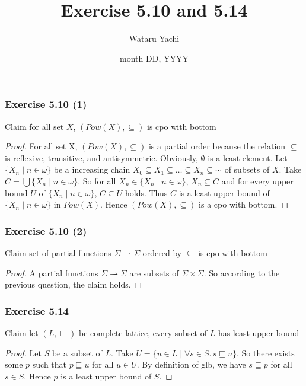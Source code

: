 \documentclass[12pt,aspectratio=169]{beamer}
\title{ Exercise 5.10 and 5.14 }
\author{Wataru Yachi}
\institute{JAIST}
\date{month DD, YYYY}
\begin{document}
\begin{frame}
    \frametitle{Exercise 5.10 (1)}
    \begin{block}{Claim}
        for all set $X$, $(Pow(X), \subseteq)$ is cpo with bottom
    \end{block}
    \pause
    \begin{proof}
        For all set X, $(Pow(X), \subseteq)$ is a partial order because the relation $\subseteq$ is
        reflexive, transitive, and antisymmetric.
        \pause
        Obviously, $\emptyset$ is a least element.
        \pause
        Let $\{X_n \mid n \in \omega \}$ be a increasing chain
        $X_0 \subseteq X_1 \subseteq \dots \subseteq X_n \subseteq \cdots $ of subsets of $X$.
        \pause
        Take $C = \bigcup \{X_n \mid n \in \omega \}$.
        \pause
        So for all $X_n \in \{X_n \mid n \in \omega\}$, $X_n \subseteq C$ and
        for every upper bound $U$ of $\{X_n \mid n \in \omega\}$, $C \subseteq U$ holds.
        \pause
        Thus $C$ is a least upper bound of $\{X_n \mid n \in \omega \}$ in $Pow(X)$.
        \pause
        Hence $(Pow(X), \subseteq)$ is a cpo with bottom.
    \end{proof}
\end{frame}

\begin{frame}
    \frametitle{Exercise 5.10 (2)}
    \begin{block}{Claim}
        set of partial functions $\Sigma \rightharpoonup \Sigma$ ordered by $\subseteq$ is cpo with bottom
    \end{block}
    \pause
    \begin{proof}
        A partial functions $\Sigma \rightharpoonup \Sigma$ are subsets of $\Sigma \times \Sigma$.
        So according to the previous question, the claim holds.
    \end{proof}
\end{frame}

\begin{frame}
    \frametitle{Exercise 5.14}
    \begin{block}{Claim}
        let $(L, \sqsubseteq)$ be complete lattice, every subset of $L$ has least upper bound
    \end{block}
    \pause

    \begin{proof}
        Let $S$ be a subset of $L$. \pause
        Take $U = \{u \in L \mid \forall s \in S . \, s \sqsubseteq u\} $.
        \pause
        So there exists some $p$ such that $p \sqsubseteq u$ for all $u \in U$.
        \pause
        By definition of glb, we have $s \sqsubseteq p$ for all $s \in S$.
        \pause
        Hence $p$ is a least upper bound of $S$.
    \end{proof}
\end{frame}
\end{document}
